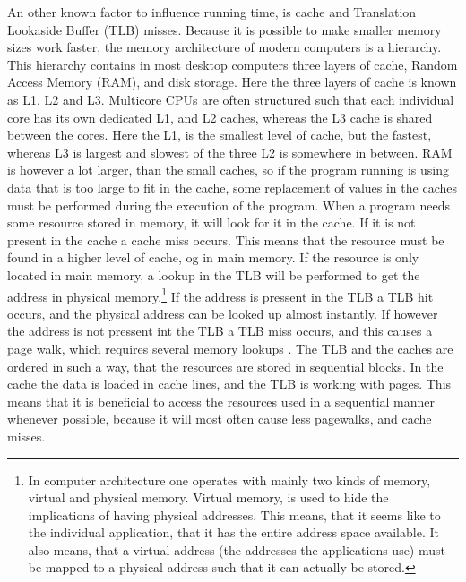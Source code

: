 \documentclass{article}
\begin{document}
An other known factor to influence running time, is cache and Translation Lookaside Buffer (TLB) misses. Because it is possible to make smaller memory sizes work faster, the memory architecture of modern computers is a hierarchy. This hierarchy contains in most desktop computers three layers of cache, Random Access Memory (RAM), and disk storage. Here the three layers of cache is known as L1, L2 and L3. Multicore CPUs are often structured such that each individual core has its own dedicated L1, and L2 caches, whereas the L3 cache is shared between the cores. Here the L1, is the smallest level of cache, but the fastest, whereas L3 is largest and slowest of the three L2 is somewhere in between. RAM is however a lot larger, than the small caches, so if the program running is using data that is too large to fit in the cache, some replacement of values in the caches must be performed during the execution of the program. 
When a program needs some resource stored in memory, it will look for it in the cache. If it is not present in the cache a cache miss occurs. This means that the resource must be found in a higher level of cache, og in main memory. If the resource is only located in main memory, a lookup in the TLB will be performed to get the address in physical memory.\footnote{In computer architecture one operates with mainly two kinds of memory, virtual and physical memory. Virtual memory, is used to hide the implications of having physical addresses. This means, that it seems like to the individual application, that it has the entire address space available. It also means, that a virtual address (the addresses the applications use) must be mapped to a physical address such that it can actually be stored.} If the address is pressent in the TLB a TLB hit occurs, and the physical address can be looked up almost instantly. If however the address is not pressent int the TLB a TLB miss occurs, and this causes a page walk, which requires several memory lookups \cite[p.~450-452]{tanenbaum}.
The TLB and the caches are ordered in such a way, that the resources are stored in sequential blocks. In the cache the data is loaded in cache lines, and the TLB is working with pages. This means that it is beneficial to access the resources used in a sequential manner whenever possible, because it will most often cause less pagewalks, and cache misses.
\end{document}
